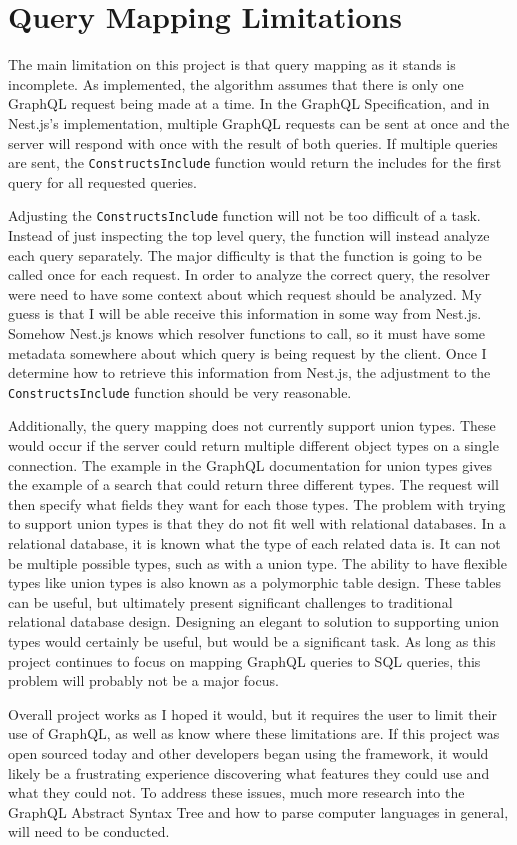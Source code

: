 \section{Query Mapping Limitations}
The main limitation on this project is that query mapping as it stands is incomplete. As implemented, the algorithm assumes that there is only one GraphQL request being made at a time.  In the GraphQL Specification, and in Nest.js's implementation, multiple GraphQL requests can be sent at once and the server will respond with once with the result of both queries.  If multiple queries are sent, the \verb!ConstructsInclude! function would return the includes for the first query for all requested queries.

Adjusting the \verb!ConstructsInclude! function will not be too difficult of a task.  Instead of just inspecting the top level query, the function will instead analyze each query separately.  The major difficulty is that the function is going to be called once for each request.  In order to analyze the correct query, the resolver were need to have some context about which request should be analyzed.  My guess is that I will be able receive this information in some way from Nest.js.  Somehow Nest.js knows which resolver functions to call, so it must have some metadata somewhere about which query is being request by the client.  Once I determine how to retrieve this information from Nest.js, the adjustment to the \verb!ConstructsInclude! function should be very reasonable.

Additionally, the query mapping does not currently support union types.  These would occur if the server could return multiple different object types on a single connection.  The example in the GraphQL documentation for union types gives the example of a search that could return three different types.  The request will then specify what fields they want for each those types.  The problem with trying to support union types is that they do not fit well with relational databases.  In a relational database, it is known what the type of each related data is.  It can not be multiple possible types, such as with a union type.  The ability to have flexible types like union types is also known as a polymorphic table design.  These tables can be useful, but ultimately present significant challenges to traditional relational database design.  Designing an elegant to solution to supporting union types would certainly be useful, but would be a significant task.  As long as this project continues to focus on mapping GraphQL queries to SQL queries, this problem will probably not be a major focus.

Overall project works as I hoped it would, but it requires the user to limit their use of GraphQL, as well as know where these limitations are.  If this project was open sourced today and other developers began using the framework, it would likely be a frustrating experience discovering what features they could use and what they could not.  To address these issues, much more research into the GraphQL Abstract Syntax Tree and how to parse computer languages in general, will need to be conducted.